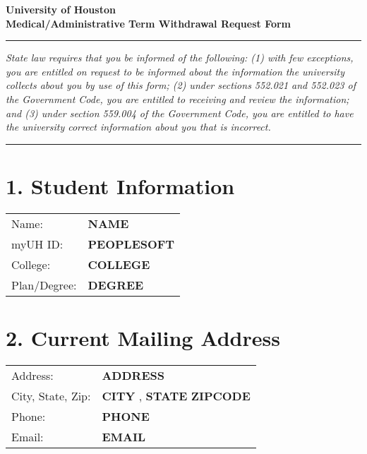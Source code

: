\documentclass[12pt]{article}
\begin{document}
\begin{center}
  \textbf{\Large University of Houston}\\[0.2cm]
  \textbf{\large Medical/Administrative Term Withdrawal Request Form}\\[0.2cm]
\end{center}

\hrule
\vspace{0.5cm}

\noindent\textit{State law requires that you be informed of the following: (1) with few exceptions, you are entitled on request to be informed about the information the university collects about you by use of this form; (2) under sections 552.021 and 552.023 of the Government Code, you are entitled to receiving and review the information; and (3) under section 559.004 of the Government Code, you are entitled to have the university correct information about you that is incorrect.}

\vspace{0.5cm}
\hrule
\vspace{0.5cm}

\section*{1. Student Information}
\begin{tabular}{ll}
Name: & \textbf{ {{NAME}} } \\
myUH ID: & \textbf{ {{PEOPLESOFT}} } \\
College: & \textbf{ {{COLLEGE}} } \\
Plan/Degree: & \textbf{ {{DEGREE}} } \\
\end{tabular}

\vspace{0.5cm}

\section*{2. Current Mailing Address}
\begin{tabular}{ll}
Address: & \textbf{ {{ADDRESS}} } \\
City, State, Zip: & \textbf{ {{CITY}} }, \textbf{ {{STATE}} } \textbf{ {{ZIPCODE}} } \\
Phone: & \textbf{ {{PHONE}} } \\
Email: & \textbf{ {{EMAIL}} } \\
\end{tabular}
\end{document}
